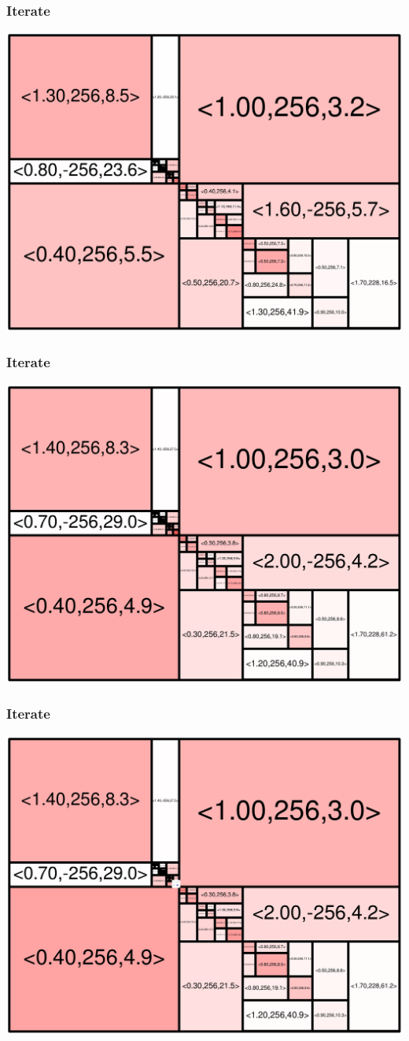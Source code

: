 \begin{frame}
\frametitle{Iterate}\begin{centering}\includegraphics[width=8.5 cm]{remy-graph/graph/test60.pdf}

\end{centering}\end{frame}


\begin{frame}
\frametitle{Iterate}\begin{centering}\includegraphics[width=8.5 cm]{remy-graph/graph/test61.pdf}

\end{centering}\end{frame}


\begin{frame}
\frametitle{Iterate}\begin{centering}\includegraphics[width=8.5 cm]{remy-graph/graph/test62.pdf}

\end{centering}\end{frame}


